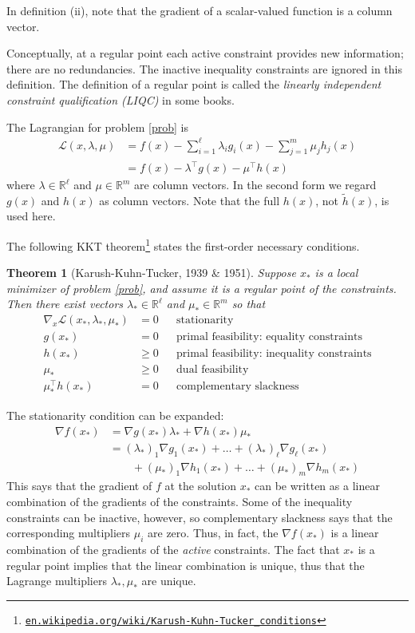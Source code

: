 \documentclass[12pt]{amsart}
\newtheorem*{thm}{Theorem}
\theoremstyle{definition}
\newcommand{\RR}{\mathbb{R}}
\newcommand{\grad}{\nabla}
\begin{document}
\noindent In definition (ii), note that the gradient of a scalar-valued function is a column vector.

Conceptually, at a regular point each active constraint provides new information; there are no redundancies.  The inactive inequality constraints are ignored in this definition.  The definition of a regular point is called the \emph{linearly independent constraint qualification (LIQC)} in some books.

The Lagrangian for problem \eqref{prob} is
\begin{align*}
\mathcal{L}(x,\lambda,\mu) &= f(x) - \sum_{i=1}^\ell \lambda_i g_i(x) - \sum_{j=1}^m \mu_j h_j(x) \\
  &= f(x) - \lambda^\top g(x) - \mu^\top h(x)
\end{align*}
where $\lambda\in\RR^\ell$ and $\mu\in\RR^m$ are column vectors.  In the second form we regard $g(x)$ and $h(x)$ as column vectors.  Note that the full $h(x)$, not $\tilde h(x)$, is used here.

\clearpage
The following KKT theorem\footnote{\href{https://en.wikipedia.org/wiki/Karush-Kuhn-Tucker_conditions}{\texttt{en.wikipedia.org/wiki/Karush-Kuhn-Tucker\_conditions}}} states the first-order necessary conditions.

\begin{thm}[Karush-Kuhn-Tucker, 1939 \& 1951]  Suppose $x_*$ is a local minimizer of problem \eqref{prob}, and assume it is a regular point of the constraints.  Then there exist vectors $\lambda_*\in\RR^\ell$ and $\mu_*\in\RR^m$ so that
\begin{align*}
\grad_x \mathcal{L}(x_*,\lambda_*,\mu_*) &= 0 &&\text{stationarity} \\
g(x_*) &= 0  &&\text{primal feasibility: equality constraints} \\
h(x_*) &\ge 0  &&\text{primal feasibility: inequality constraints} \\
\mu_* &\ge 0 &&\text{dual feasibility} \\
\mu_*^\top h(x_*) &= 0 &&\text{complementary slackness}
\end{align*}
\end{thm}

\medskip
\noindent The stationarity condition can be expanded:
\begin{align*}
\grad f(x_*) &= \grad g(x_*) \lambda_* + \grad h(x_*) \mu_* \\
  &= (\lambda_*)_1 \grad g_1(x_*) + \dots + (\lambda_*)_\ell \grad g_\ell(x_*) \\
  &\qquad + (\mu_*)_1 \grad h_1(x_*) + \dots + (\mu_*)_m \grad h_m(x_*)
\end{align*}
This says that the gradient of $f$ at the solution $x_*$ can be written as a linear combination of the gradients of the constraints.  Some of the inequality constraints can be inactive, however, so complementary slackness says that the corresponding multipliers $\mu_i$ are zero.  Thus, in fact, the $\grad f(x_*)$ is a linear combination of the gradients of the \emph{active} constraints.  The fact that $x_*$ is a regular point implies that the linear combination is unique, thus that the Lagrange multipliers $\lambda_*,\mu_*$ are unique.
\end{document}
